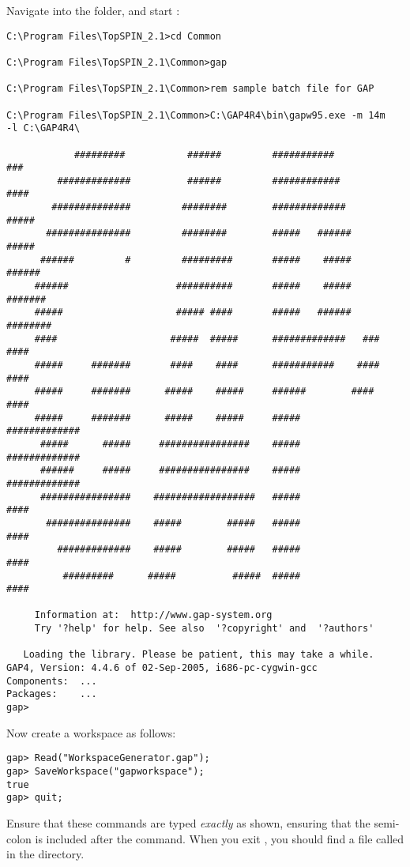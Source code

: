 Navigate into the  folder, and start \gap:
%
\begin{lstlisting}
C:\Program Files\TopSPIN_2.1>cd Common

C:\Program Files\TopSPIN_2.1\Common>gap

C:\Program Files\TopSPIN_2.1\Common>rem sample batch file for GAP

C:\Program Files\TopSPIN_2.1\Common>C:\GAP4R4\bin\gapw95.exe -m 14m
-l C:\GAP4R4\

            #########           ######         ###########           ###
         #############          ######         ############         ####
        ##############         ########        #############       #####
       ###############         ########        #####   ######      #####
      ######         #         #########       #####    #####     ######
     ######                   ##########       #####    #####    #######
     #####                    ##### ####       #####   ######   ########
     ####                    #####  #####      #############   ###  ####
     #####     #######       ####    ####      ###########    ####  ####
     #####     #######      #####    #####     ######        ####   ####
     #####     #######      #####    #####     #####         #############
      #####      #####     ################    #####         #############
      ######     #####     ################    #####         #############
      ################    ##################   #####                ####
       ###############    #####        #####   #####                ####
         #############    #####        #####   #####                ####
          #########      #####          #####  #####                ####

     Information at:  http://www.gap-system.org
     Try '?help' for help. See also  '?copyright' and  '?authors'

   Loading the library. Please be patient, this may take a while.
GAP4, Version: 4.4.6 of 02-Sep-2005, i686-pc-cygwin-gcc
Components:  ...
Packages:    ...
gap>
\end{lstlisting}
%
Now create a workspace as follows:
%
\begin{lstlisting}
gap> Read("WorkspaceGenerator.gap");
gap> SaveWorkspace("gapworkspace");
true
gap> quit;
\end{lstlisting}
%
Ensure that these commands are typed \emph{exactly} as shown,
ensuring that the semi-colon is included after the 
command.  When you exit \gap, you should find a file called
 in the  directory.
%
